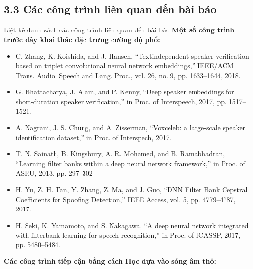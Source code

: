 \documentclass{article}
\begin{document}
	\subsection{3.3 Các công trình liên quan đến bài báo}
	Liệt kê danh sách các công trình liên quan đến bài báo
	\textbf{Một số công trình trước đây khai thác đặc trưng cường độ phổ:}
	\begin{itemize}
		\item C. Zhang, K. Koishida, and J. Hansen, “Textindependent speaker verification based on triplet convolutional neural network embeddings,” IEEE/ACM Trans. Audio, Speech and Lang. Proc., vol. 26, no. 9,
		pp. 1633–1644, 2018.
		
		\item G. Bhattacharya, J. Alam, and P. Kenny, “Deep speaker
		embeddings for short-duration speaker verification,” in
		Proc. of Interspeech, 2017, pp. 1517–1521.
		
		\item A. Nagrani, J. S. Chung, and A. Zisserman, “Voxceleb:
		a large-scale speaker identification dataset,” in Proc. of
		Interspech, 2017.
		
		\item T. N. Sainath, B. Kingsbury, A. R. Mohamed, and
		B. Ramabhadran, “Learning filter banks within a deep
		neural network framework,” in Proc. of ASRU, 2013,
		pp. 297–302
		
		\item H. Yu, Z. H. Tan, Y. Zhang, Z. Ma, and J. Guo, “DNN
		Filter Bank Cepstral Coefficients for Spoofing Detection,” IEEE Access, vol. 5, pp. 4779–4787, 2017.
		
		\item H. Seki, K. Yamamoto, and S. Nakagawa, “A deep
		neural network integrated with filterbank learning for
		speech recognition,” in Proc. of ICASSP, 2017, pp.
		5480–5484.
	\end{itemize}
	\textbf{Các công trình tiếp cận bằng cách Học dựa vào sóng âm thô:}
\end{document}
